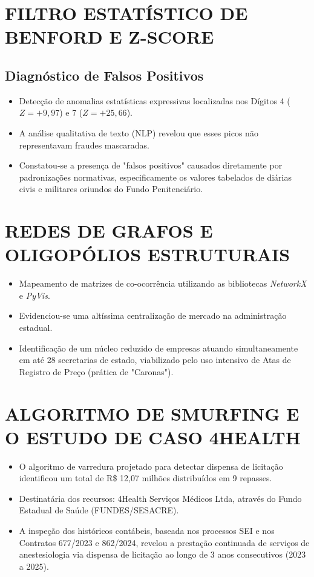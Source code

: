 \documentclass[
    12pt,               %
    openright,          %
    oneside,            %
    a4paper,            %
    chapter=TITLE,      %
    sumario=tradicional,%
    english,            %
    brazilian,          %
 ]{abntex2}
\begin{document}
\section{FILTRO ESTATÍSTICO DE BENFORD E Z-SCORE}
\subsection{Diagnóstico de Falsos Positivos}
\begin{itemize}
    \item Detecção de anomalias estatísticas expressivas localizadas nos Dígitos 4 ($Z = +9,97$) e 7 ($Z = +25,66$).
    \item A análise qualitativa de texto (NLP) revelou que esses picos não representavam fraudes mascaradas.
    \item Constatou-se a presença de "falsos positivos" causados diretamente por padronizações normativas, especificamente os valores tabelados de diárias civis e militares oriundos do Fundo Penitenciário.
\end{itemize}

\section{REDES DE GRAFOS E OLIGOPÓLIOS ESTRUTURAIS}
\begin{itemize}
    \item Mapeamento de matrizes de co-ocorrência utilizando as bibliotecas \textit{NetworkX} e \textit{PyVis}.
    \item Evidenciou-se uma altíssima centralização de mercado na administração estadual.
    \item Identificação de um núcleo reduzido de empresas atuando simultaneamente em até 28 secretarias de estado, viabilizado pelo uso intensivo de Atas de Registro de Preço (prática de "Caronas").
\end{itemize}

\section{ALGORITMO DE SMURFING E O ESTUDO DE CASO 4HEALTH}
\begin{itemize}
    \item O algoritmo de varredura projetado para detectar dispensa de licitação identificou um total de R\$ 12,07 milhões distribuídos em 9 repasses.
    \item Destinatária dos recursos: 4Health Serviços Médicos Ltda, através do Fundo Estadual de Saúde (FUNDES/SESACRE).
    \item A inspeção dos históricos contábeis, baseada nos processos SEI e nos Contratos 677/2023 e 862/2024, revelou a prestação continuada de serviços de anestesiologia via dispensa de licitação ao longo de 3 anos consecutivos (2023 a 2025).
\end{itemize}
\end{document}
